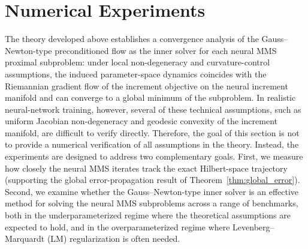 \documentclass[twoside,11pt]{article}
\begin{document}
\section{Numerical Experiments}\label{sec:experiments}

The theory developed above establishes a convergence analysis of the
Gauss--Newton-type preconditioned flow as the inner solver for each neural MMS proximal
subproblem: under local non-degeneracy and curvature-control assumptions, the induced
parameter-space dynamics coincides with the Riemannian gradient flow of the increment
objective on the neural increment manifold and can converge to a global minimum of the subproblem. In realistic neural-network training,
however, several of these technical assumptions, such as uniform Jacobian non-degeneracy
and geodesic convexity of the increment manifold, are difficult to verify directly. Therefore,
the goal of this section is not to provide a numerical verification of all assumptions
in the theory. Instead, the experiments are designed to address two complementary goals.
First, we measure how closely the neural MMS iterates track the exact Hilbert-space
trajectory (supporting the global error-propagation result of Theorem~\ref{thm:global_error}).
Second, we examine whether the Gauss--Newton-type inner solver is an effective method
for solving the neural MMS subproblems across a range of benchmarks, both in the
underparameterized regime where the theoretical assumptions are expected to hold,
and in the overparameterized regime where Levenberg--Marquardt (LM) regularization is often needed.
\end{document}
